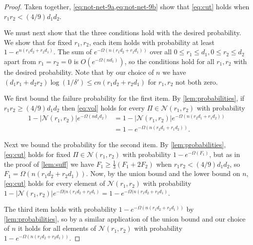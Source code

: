 \documentclass[aos]{imsart}
\theoremstyle{definition}
\numberwithin{equation}{section}
\newcommand{\cN}{\mathcal{N}}
\begin{document}
\begin{appendix}
\begin{proof}
Taken together, \cref{eq:not-net-9a,eq:not-net-9b} show that \cref{eq:cut} holds when $r_1 r_2 < (4/9) d_1 d_2$.

We must next show that the three conditions hold with the desired probability. We show that for fixed $r_1, r_2$, each item holds with probability at least $1 - e^{n (r_1 d_2 + r_2 d_1)}$. The sum of $e^{-\Omega(n (r_1d_2 + r_2 d_1))}$ over all $0 \leq r_1 \leq d_1, 0 \leq r_2 \leq d_2$ apart from $r_1 = r_2 = 0$ is $O(e^{- \Omega( n d_1)})$, so the conditions hold for all $r_1, r_2$ with the desired probability. Note that by our choice of $n$ we have $(d_1r_1 + d_2 r_2) \log(1/\delta') \leq c n (r_1d_2 + r_2 d_1)$ for $r_1, r_2$ not both zero.

We first bound the failure probability for the first item. By \cref{lem:probabilities}, if $r_1 r_2 \geq (4/9) d_1 d_2$ then \cref{eq:vol} holds for every $\Pi \in \cN(r_1, r_2)$ with probability
\begin{align*}
1 - |\cN(r_1, r_2)|e^{- \Omega( n d_1 d_2) } &= 1 - |\cN(r_1, r_2)| e^{ - \Omega(n (r_2d_1 + r_1d_2))}\\
&= 1 - e^{ - \Omega(n (r_2d_1 + r_1d_2))}.
\end{align*}

Next we bound the probability for the second item. By \cref{lem:probabilities}, \cref{eq:cut} holds for fixed $\Pi \in \cN(r_1, r_2)$ with probability $1 - e^{-\Omega( F_1)}$, but as in the proof of \cref{lem:suff} we have $F_1 \geq \frac{1}{3} (F_1 + 2 F_2)$ when $r_1 r_2 < (4/9) d_1 d_2$, so $F_1 = \Omega(n (r_1d_2 + r_2 d_1))$. Now, by the union bound and the lower bound on $n$, \cref{eq:cut} holds for every element of $\cN(r_1, r_2)$ with probability $1 - |\cN(r_1,r_2)| e^{-\Omega(n (r_1d_2 + r_2 d_1)} = 1 - e^{-\Omega(n (r_1d_2 + r_2 d_1)}$.


The third item holds with probability $1 - e^{-\Omega(n (r_1d_2 + r_2 d_1))}$ by \cref{lem:probabilities}, so by a similar application of the union bound and our choice of $n$ it holds for all elements of $\cN(r_1, r_2)$ with probability $1 - e^{-\Omega(n (r_1d_2 + r_2 d_1))}$. \end{proof}


\end{appendix}
\end{document}
